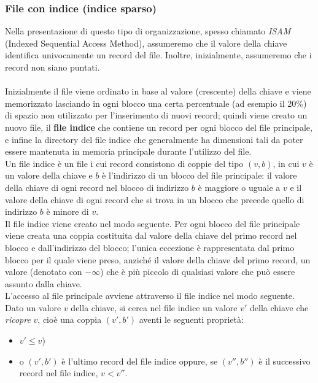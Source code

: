 \subsubsection{File con indice (indice sparso)}
Nella presentazione di questo tipo di organizzazione, spesso chiamato \emph{ISAM} (Indexed Sequential
Access Method), assumeremo che il valore della chiave identifica univocamente un record del file.
Inoltre, inizialmente, assumeremo che i record non siano puntati.\\\\
Inizialmente il file viene ordinato in base al valore (crescente) della chiave e viene memorizzato
lasciando in ogni blocco una certa percentuale (ad esempio il 20\%) di spazio non utilizzato per
l'inserimento di nuovi record; quindi viene creato un nuovo file, il \textbf{file indice} che
contiene un record per ogni blocco del file principale, e infine la directory del file indice che 
generalmente ha dimensioni tali da poter essere mantenuta in memoria principale durante l'utilizzo del file.\\
Un file indice è un file i cui record consistono di coppie del tipo $(v, b)$, in cui $v$ è un valore della
chiave e $b$ è l'indirizzo di un blocco del file principale: il valore della chiave di ogni record nel
blocco di indirizzo $b$ è maggiore o uguale a $v$ e il valore della chiave di ogni record che si trova in
un blocco che precede quello di indirizzo $b$ è minore di $v$.\\
Il file indice viene creato nel modo seguente. Per ogni blocco del file principale viene creata una
coppia costituita dal valore della chiave del primo record nel blocco e dall'indirizzo del blocco;
l'unica eccezione è rappresentata dal primo blocco per il quale viene preso, anziché il valore della
chiave del primo record, un valore (denotato con $-\infty$) che è più piccolo di qualsiasi valore che può
essere assunto dalla chiave.\\
L'accesso al file principale avviene attraverso il file indice nel modo seguente. Dato un valore $v$
della chiave, si cerca nel file indice un valore $v'$ della chiave che \emph{ricopre} $v$, cioè una coppia 
$(v', b')$ aventi le seguenti proprietà:
\begin{itemize}
 \item $v' \leq v$)
 \item o $(v', b')$ è l'ultimo record del file indice oppure, se $(v'', b'')$ è il successivo record 
 nel file indice, $v<v''$.
\end{itemize}

